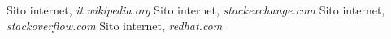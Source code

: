 \documentclass[12pt,a4paper]{article}
\begin{document}
\clearpage

\begin{thebibliography}{9}
        \bibitem{}
            Sito internet,
            \textit{it.wikipedia.org}
        \bibitem{}
            Sito internet,
            \textit{stackexchange.com}
        \bibitem{}
            Sito internet,
            \textit{stackoverflow.com}
        \bibitem{}
            Sito internet,
            \textit{redhat.com}
    \end{thebibliography}
\end{document}
